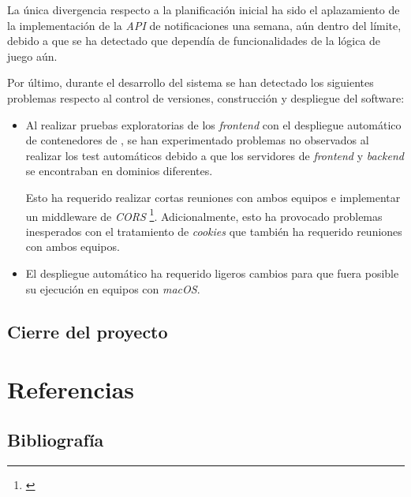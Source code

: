 \documentclass[11pt, a4paper, titlepage]{article}
\begin{document}
La única divergencia respecto a la planificación inicial ha sido el aplazamiento de la implementación de la \textit{API} de notificaciones una semana, aún dentro del límite, debido a que se ha detectado que dependía de funcionalidades de la lógica de juego aún.

Por último, durante el desarrollo del sistema se han detectado los siguientes problemas respecto al control de versiones, construcción y despliegue del software:
\begin{itemize}
    \item Al realizar pruebas exploratorias de los \textit{frontend} con el despliegue automático de contenedores de , se han experimentado problemas no observados al realizar los test automáticos debido a que los servidores de \textit{frontend} y \textit{backend} se encontraban en dominios diferentes. 
    
    Esto ha requerido realizar cortas reuniones con ambos equipos e implementar un middleware de \textit{CORS} \footnote{\href{https://developer.mozilla.org/en-US/docs/Web/HTTP/CORS}{}}. Adicionalmente, esto ha provocado problemas inesperados con el tratamiento de \textit{cookies} que también ha requerido reuniones con ambos equipos.
    
    \item El despliegue automático ha requerido ligeros cambios para que fuera posible su ejecución en equipos con \textit{macOS}.
\end{itemize}



\subsection{Cierre del proyecto}


\clearpage

\newpage
\section{Referencias}
\subsection{Bibliografía}
\printbibliography
\end{document}
